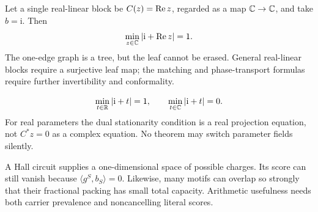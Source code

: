 \begin{example}
Let a single real-linear block be \(C(z)=\operatorname{Re} z\), regarded as a map
\(\mathbb C\to\mathbb C\), and take \(b=\mathrm i\).  Then
\[
 \min_{z\in\mathbb C}|\mathrm i+\operatorname{Re} z|=1.
\]
The one-edge graph is a tree, but the leaf cannot be erased.  General
real-linear blocks require a surjective leaf map; the matching and
phase-transport formulas require further invertibility and conformality.
\end{example}

\begin{example}
\[
 \min_{t\in\mathbb R}|\mathrm i+t|=1,
 \qquad
 \min_{t\in\mathbb C}|\mathrm i+t|=0.
\]
For real parameters the dual stationarity condition is a real
projection equation, not \(C^*z=0\) as a complex equation.  No theorem
may switch parameter fields silently.
\end{example}

\begin{remark}
A Hall circuit supplies a one-dimensional space of possible charges.
Its score can still vanish because
\(\langle g^S,b_S\rangle=0\).  Likewise, many motifs can overlap so
strongly that their fractional packing has small total capacity.
Arithmetic usefulness needs both carrier prevalence and noncancelling
literal scores.
\end{remark}


